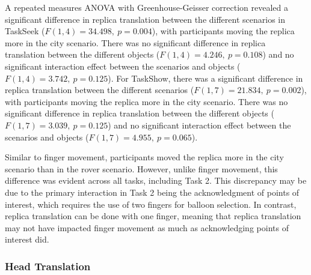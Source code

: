             A repeated measures ANOVA with Greenhouse-Geisser correction revealed a significant difference in replica translation between the different scenarios in TaskSeek ($F(1, 4) = 34.498,\ p = 0.004$), with participants moving the replica more in the city scenario. There was no significant difference in replica translation between the different objects ($F(1, 4) = 4.246,\ p = 0.108$) and no significant interaction effect between the scenarios and objects ($F(1, 4) = 3.742,\ p = 0.125$). For TaskShow, there was a significant difference in replica translation between the different scenarios ($F(1, 7) = 21.834,\ p = 0.002$), with participants moving the replica more in the city scenario. There was no significant difference in replica translation between the different objects ($F(1, 7) = 3.039,\ p = 0.125$) and no significant interaction effect between the scenarios and objects ($F(1, 7) = 4.955,\ p = 0.065$).

            Similar to finger movement, participants moved the replica more in the city scenario than in the rover scenario. However, unlike finger movement, this difference was evident across all tasks, including Task 2. This discrepancy may be due to the primary interaction in Task 2 being the acknowledgment of points of interest, which requires the use of two fingers for balloon selection. In contrast, replica translation can be done with one finger, meaning that replica translation may not have impacted finger movement as much as acknowledging points of interest did.

        \subsubsection{Head Translation}


